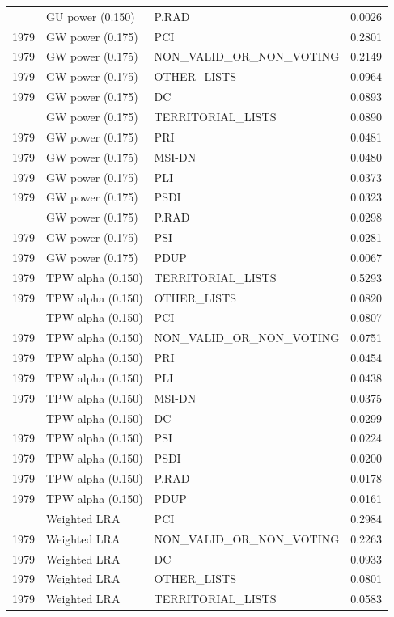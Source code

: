 \begin{longtable}[t]{rllr}
\addlinespace
1979 & GU power (0.150) & P.RAD & 0.0026\\
1979 & GW power (0.175) & PCI & 0.2801\\
1979 & GW power (0.175) & NON\_VALID\_OR\_NON\_VOTING & 0.2149\\
1979 & GW power (0.175) & OTHER\_LISTS & 0.0964\\
1979 & GW power (0.175) & DC & 0.0893\\
\addlinespace
1979 & GW power (0.175) & TERRITORIAL\_LISTS & 0.0890\\
1979 & GW power (0.175) & PRI & 0.0481\\
1979 & GW power (0.175) & MSI-DN & 0.0480\\
1979 & GW power (0.175) & PLI & 0.0373\\
1979 & GW power (0.175) & PSDI & 0.0323\\
\addlinespace
1979 & GW power (0.175) & P.RAD & 0.0298\\
1979 & GW power (0.175) & PSI & 0.0281\\
1979 & GW power (0.175) & PDUP & 0.0067\\
1979 & TPW alpha (0.150) & TERRITORIAL\_LISTS & 0.5293\\
1979 & TPW alpha (0.150) & OTHER\_LISTS & 0.0820\\
\addlinespace
1979 & TPW alpha (0.150) & PCI & 0.0807\\
1979 & TPW alpha (0.150) & NON\_VALID\_OR\_NON\_VOTING & 0.0751\\
1979 & TPW alpha (0.150) & PRI & 0.0454\\
1979 & TPW alpha (0.150) & PLI & 0.0438\\
1979 & TPW alpha (0.150) & MSI-DN & 0.0375\\
\addlinespace
1979 & TPW alpha (0.150) & DC & 0.0299\\
1979 & TPW alpha (0.150) & PSI & 0.0224\\
1979 & TPW alpha (0.150) & PSDI & 0.0200\\
1979 & TPW alpha (0.150) & P.RAD & 0.0178\\
1979 & TPW alpha (0.150) & PDUP & 0.0161\\
\addlinespace
1979 & Weighted LRA & PCI & 0.2984\\
1979 & Weighted LRA & NON\_VALID\_OR\_NON\_VOTING & 0.2263\\
1979 & Weighted LRA & DC & 0.0933\\
1979 & Weighted LRA & OTHER\_LISTS & 0.0801\\
1979 & Weighted LRA & TERRITORIAL\_LISTS & 0.0583\\

\end{longtable}
